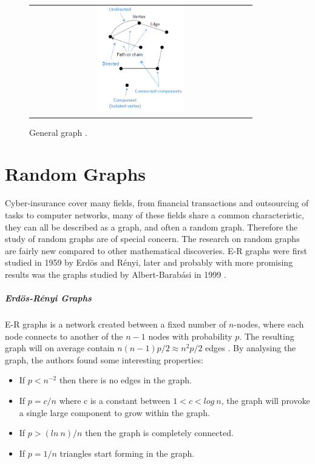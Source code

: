 \begin{figure}[h]
\centering
\begin{tabular}{@{}c@{}}
\includegraphics[width=0.4\textwidth]{../Figures/generalGraph.png}
\end{tabular}
\caption{\label{fig:generalGraph} General graph \cite{audestad}.}
\end{figure}


\section{Random Graphs}
Cyber-insurance cover many fields, from financial transactions and outsourcing of tasks to computer networks, many of these fields share a common characteristic, they can all be described as a graph, and often a random graph. Therefore the study of random graphs are of special concern. The research on random graphs are fairly new compared to other mathematical discoveries. E-R graphs were first studied in 1959 by Erdös and Rényi, later and probably with more promising results was the graphs studied by Albert-Barabási in 1999 \cite{audestad}. 
\subparagraph{Erdös-Rényi Graphs}
E-R graphs is a network created between a fixed number of $n$-nodes, where each node connects to another of the $n-1$ nodes with 
probability $p$. The resulting graph will on average contain $n(n-1)p/2 \approx n^{2}p/2$ edges \cite{barabasi}. 
By analysing the graph, the authors found some interesting properties:

\begin{itemize}
\item If $p<n^{-2}$  then there is no edges in the graph. 
\item If $p=c/n$ where c is a constant between $1 < c < log\: n$, the graph will provoke a single large component to grow within the graph.
\item If $p>(ln\: n)/n$ then the graph is completely connected. 
\item If $p = 1/n$ triangles start forming in the graph. 
\end{itemize}

